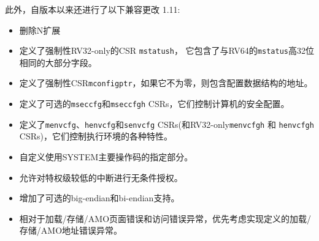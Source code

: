 此外，自版本以来还进行了以下兼容更改
1.11:
\vspace{-0.2in}
\begin{itemize}
  \parskip 0pt
  \itemsep 1pt
\item 删除N扩展
\item 定义了强制性RV32-only的CSR {\tt mstatush}，
      它包含了与RV64的{\tt mstatus}高32位相同的大部分字段。
\item 定义了强制性CSR{\tt mconfigptr}，如果它不为零，则包含配置数据结构的地址。
\item 定义了可选的{\tt mseccfg}和{\tt mseccfgh} CSRs，它们控制计算机的安全配置。
\item 定义了{\tt menvcfg}、{\tt henvcfg}和{\tt senvcfg} CSRs(和RV32-only{\tt menvcfgh} 
      和 {\tt henvcfgh} CSRs)，它们控制执行环境的各种特性。
\item 自定义使用SYSTEM主要操作码的指定部分。
\item 允许对特权级较低的中断进行无条件授权。
\item 增加了可选的big-endian和bi-endian支持。
\item 相对于加载/存储/AMO页面错误和访问错误异常，优先考虑实现定义的加载/存储/AMO地址错误异常。

\end{itemize}
